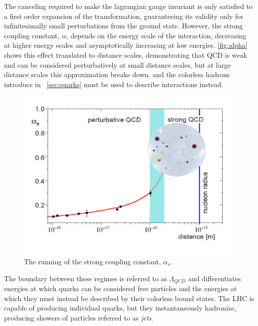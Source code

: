 The canceling required to make the lagrangian gauge invariant is only satisfied to a first order expansion of the transformation, guaranteeing its validity only for infinitesimally small perturbations from the ground state. However, the strong coupling constant, $\alpha$, depends on the energy scale of the interaction, decreasing at higher energy scales and asymptotically increasing at low energies. \autoref{fig:alpha} shows this effect translated to distance scales, demonstrating that QCD is weak and can be considered perturbatively at small distance scales, but at large distance scales this approximation breaks down, and the colorless hadrons introduce in ~\autoref{sec:quarks} must be used to describe interactions instead. 

\begin{centering}
\begin{figure}[!htb]
\myfloatalign
\includegraphics[width=.85\linewidth]{figures/theory/strong_coupling.png}
\caption{The running of the strong coupling constant, $\alpha_s$. \cite{Messchendorp:2013ysj}}
\label{fig:alpha}
\end{figure}
\end{centering}

The boundary between these regimes is referred to as $\Lambda_{QCD}$ and differentiates energies at which quarks can be considered free particles and the energies at which they must instead be described by their colorless bound states. The \ac{LHC} is capable of producing individual quarks, but they instantaneously hadronize, producing showers of particles referred to as \textit{jets}. 



